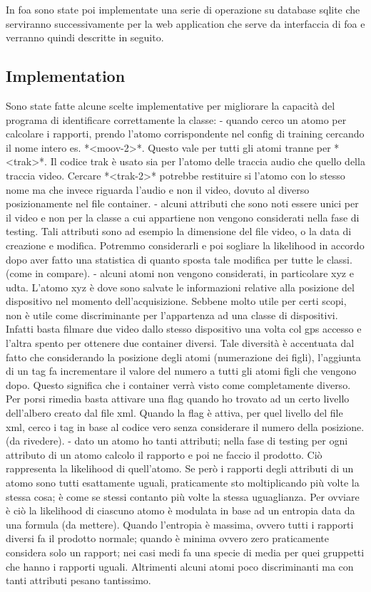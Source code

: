In foa sono state poi implementate una serie di operazione su database sqlite che serviranno successivamente per la web application che serve da interfaccia di foa e verranno quindi descritte in seguito.

\subsection{Implementation}

Sono state fatte alcune scelte implementative per migliorare la capacità del programa di identificare correttamente la classe:
- quando cerco un atomo per calcolare i rapporti, prendo l'atomo corrispondente nel config di training cercando il nome intero es. *<moov-2>*. Questo vale per tutti gli atomi tranne per *<trak>*. Il codice trak è usato sia per l'atomo delle traccia audio che quello della traccia video. Cercare *<trak-2>* potrebbe restituire si l'atomo con lo stesso nome ma che invece riguarda l'audio e non il video, dovuto al diverso posizionamente nel file container.
- alcuni attributi che sono noti essere unici per il video e non per la classe a cui appartiene non vengono considerati nella fase di testing. Tali attributi sono ad esempio la dimensione del file video, o la data di creazione e modifica. Potremmo considerarli e poi sogliare la likelihood in accordo dopo aver fatto una statistica di quanto sposta tale modifica per tutte le classi. (come in compare).
- alcuni atomi non vengono considerati, in particolare xyz e udta. L'atomo xyz è dove sono salvate le informazioni relative alla posizione del dispositivo nel momento dell'acquisizione. Sebbene molto utile per certi scopi, non è utile come discriminante per l'appartenza ad una classe di dispositivi. Infatti basta filmare due video dallo stesso dispositivo una volta col gps accesso e l'altra spento per ottenere due container diversi. Tale diversità è accentuata dal fatto che considerando la posizione degli atomi (numerazione dei figli), l'aggiunta di un tag fa incrementare il valore del numero a tutti gli atomi figli che vengono dopo. Questo significa che i container verrà visto come completamente diverso. Per porsi rimedia basta attivare una flag quando ho trovato ad un certo livello dell'albero creato dal file xml. Quando la flag è attiva, per quel livello del file xml, cerco i tag in base al codice vero senza considerare il numero della posizione. (da rivedere).
- dato un atomo ho tanti attributi; nella fase di testing per ogni attributo di un atomo calcolo il rapporto e poi ne faccio il prodotto. Ciò rappresenta la likelihood di quell'atomo. Se però i rapporti degli attributi di un atomo sono tutti esattamente uguali, praticamente sto moltiplicando più volte la stessa cosa; è come se stessi contanto più volte la stessa uguaglianza. Per ovviare è ciò la likelihood di ciascuno atomo è modulata in base ad un entropia data da una formula (da mettere). Quando l'entropia è massima, ovvero tutti i rapporti diversi fa il prodotto normale; quando è minima ovvero zero praticamente considera solo un rapport; nei casi medi fa una specie di media per quei gruppetti che hanno i rapporti uguali. Altrimenti alcuni atomi poco discriminanti ma con tanti attributi pesano tantissimo.
